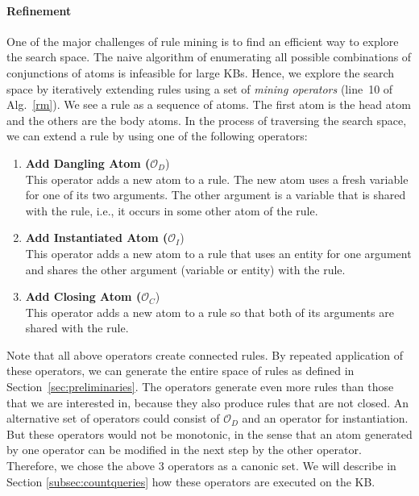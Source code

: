 \begin{algorithm}
\begin{algorithmic}[1]
\paragraph{Refinement}\label{subsubsec:refinement}
One of the major challenges of rule mining is to find an efficient way to explore the search space. 
The naive algorithm of enumerating all possible combinations of conjunctions of atoms is infeasible for large KBs.
Hence, we explore the search space by iteratively extending rules using a set of \emph{mining operators} (line~10 of Alg.~\ref{rm}).
We see a rule as a sequence of atoms. The first atom is the head atom and the others are the body atoms. 
In the process of traversing the search space, we can extend a rule by using one of the following operators:
\begin{enumerate}
\item \textbf{Add Dangling Atom ($\mathcal{O}_D$})\\
This operator adds a new atom to a rule. The new atom uses a fresh variable for one of its two arguments. The other argument is a variable
that is shared with the rule, i.e., it occurs in some other atom of the rule.
\item \textbf{Add Instantiated Atom ($\mathcal{O}_I$})\\
This operator adds a new atom to a rule that uses an entity for one argument and shares the other argument (variable or entity) with the rule.
\item \textbf{Add Closing Atom ($\mathcal{O}_C$})\\
This operator adds a new atom to a rule so that both of its arguments are shared with the rule.
\end{enumerate}
Note that all above operators create connected rules.
By repeated application of these operators, we can generate the entire space of rules as defined in Section~\ref{sec:preliminaries}.
The operators generate even more rules than those that we are interested in, because they also produce rules that are not closed.
An alternative set of operators could consist of $\mathcal{O}_D$ and an operator for instantiation.
But these operators would not be monotonic, in the sense that an atom generated by one operator can be modified in the next step by the other operator.
Therefore, we chose the above 3 operators as a canonic set. We will describe in Section \ref{subsec:countqueries} how these operators are executed on the KB.

\end{algorithmic}
\end{algorithm}
